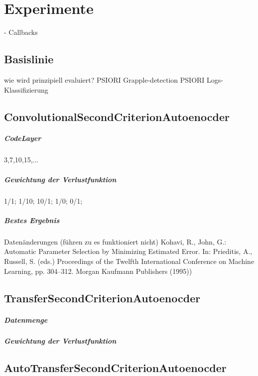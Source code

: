 \chapter{Experimente}
\label{chap:Experimente}

- Callbacks

	\section{Basislinie}
	\label{sec:Basislinie}
	wie wird prinzipiell evaluiert?
	PSIORI Grapple-detection
	PSIORI Logs-Klassifizierung
		
	\section{ConvolutionalSecondCriterionAutoenocder}
	\label{sec:ConvolutionalSecondCriterionAutoenocder}
			\paragraph{CodeLayer}
				3,7,10,15,...
			\paragraph{Gewichtung der Verlustfunktion}
			1/1; 1/10; 10/1; 1/0; 0/1;
			\paragraph{Bestes Ergebnis}
			
			
			
			
	Datenänderungen (führen zu es funktioniert nicht)
	 Kohavi, R., John, G.: Automatic Parameter Selection by Minimizing Estimated Error. In:
	Prieditis, A., Russell, S. (eds.) Proceedings of the Twelfth International Conference on
	Machine Learning, pp. 304–312. Morgan Kaufmann Publishers (1995))			

			
	\section{TransferSecondCriterionAutoenocder}
	\label{sec:TransferSecondCriterionAutoenocder}
			\paragraph{Datenmenge}
			\paragraph{Gewichtung der Verlustfunktion}
	\section{AutoTransferSecondCriterionAutoenocder}
	\label{sec:AutoTransferSecondCriterionAutoenocder}


		